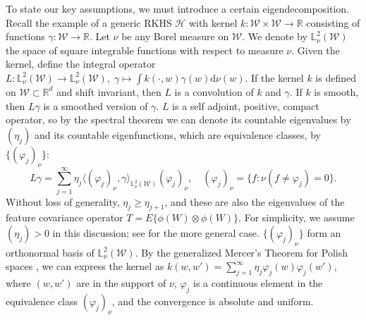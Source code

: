 To state our key assumptions, we must introduce a certain eigendecomposition. Recall the example of a generic RKHS $\mathcal{H}$ with kernel $k:\mathcal{W}\times \mathcal{W}\rightarrow \mathbb{R}$ consisting of functions $\gamma:\mathcal{W}\rightarrow \mathbb{R}$. Let $\nu$ be any Borel measure on $\mathcal{W}$. We denote by $\mathbb{L}^2_{\nu}(\mathcal{W})$ the space of square integrable functions with respect to measure $\nu$. Given the kernel, define the integral operator
$
L:\mathbb{L}_{\nu}^2(\mathcal{W})\rightarrow \mathbb{L}_{\nu}^2(\mathcal{W}),\; \gamma \mapsto \int k(\cdot,w)\gamma(w)\mathrm{d}\nu(w)
$. 
If the kernel $k$ is defined on $\mathcal{W}\subset\mathbb{R}^d$ and shift invariant, then $L$ is a convolution of $k$ and $\gamma$. If $k$ is smooth, then $L\gamma$ is a smoothed version of $\gamma$. $L$ is a self adjoint, positive, compact operator, so by the spectral theorem we can denote its countable eigenvalues by $(\eta_j)$ and its countable eigenfunctions, which are equivalence classes, by $\{(\varphi_j)_{\nu}\}$:
$$
L\gamma =\sum_{j=1}^{\infty} \eta_j\langle (\varphi_j)_{\nu},\gamma \rangle_{\mathbb{L}^2_{\nu}(\mathcal{W})}  (\varphi_j)_{\nu},\quad (\varphi_j)_{\nu}=\{f:\nu(f\neq \varphi_j)=0\}.
$$
Without loss of generality, $\eta_j\geq \eta_{j+1}$, and these are also the eigenvalues of the feature covariance operator $T=E\{\phi(W)\otimes \phi(W)\}$. For simplicity, we assume $(\eta_j)>0$ in this discussion; see \cite[Remark 3]{cucker2002mathematical} for the more general case. $\{(\varphi_j)_{\nu}\}$ form an orthonormal basis of $\mathbb{L}_{\nu}^2(\mathcal{W})$. By the generalized Mercer's Theorem for Polish spaces \cite[Corollary 3.5]{steinwart2012mercer}, we can express the kernel as $k(w,w')=\sum_{j=1}^{\infty}\eta_j \varphi_j(w)\varphi_j(w')$, where $(w,w')$ are in the support of $\nu$, $\varphi_j$ is a continuous element in the equivalence class $(\varphi_j)_{\nu}$, and the convergence is absolute and uniform.

